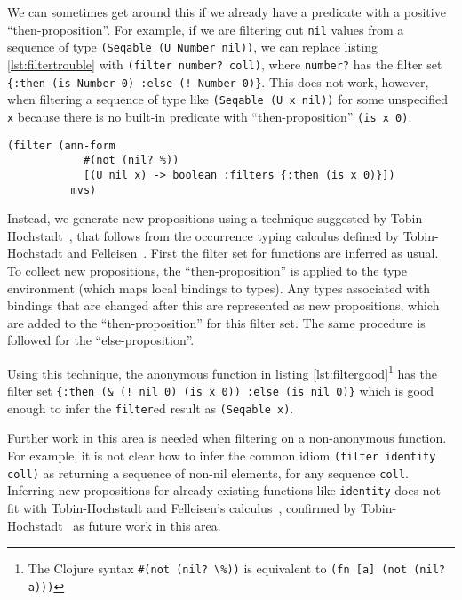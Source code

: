 We can sometimes get around this if we already have a predicate with a positive
``then-proposition''. For example, if we are filtering out \lstinline|nil| values
from a sequence of type \lstinline|(Seqable (U Number nil))|, we can replace
listing \ref{lst:filtertrouble} with \lstinline|(filter number? coll)|,
where \lstinline|number?| has the filter set \lstinline|{:then (is Number 0) :else (! Number 0)}|.
This does not work, however, when filtering a sequence of type like \lstinline|(Seqable (U x nil))|
for some unspecified \lstinline|x| because there is no built-in predicate with ``then-proposition''
\lstinline|(is x 0)|.

\begin{lstlisting}[caption=Filtering with negative propositions, label=lst:filtergood]
  (filter (ann-form 
            #(not (nil? %))
            [(U nil x) -> boolean :filters {:then (is x 0)}])
          mvs)
\end{lstlisting}

Instead, we generate new propositions using a technique 
suggested by Tobin-Hochstadt~\cite{Tob12},
that follows from the occurrence typing calculus defined 
by Tobin-Hochstadt and Felleisen~\cite{TF10}.
First the filter set for functions are inferred as usual.
To collect new propositions, the ``then-proposition'' is applied to the type environment (which maps
local bindings to types). Any types associated with bindings that are changed after this
are represented as new propositions, which are added to the ``then-proposition'' for this filter set.
The same procedure is followed for the ``else-proposition''.

Using this technique, the anonymous function in listing 
\ref{lst:filtergood}\footnote{The Clojure syntax \lstinline|#(not (nil? \%))| 
is equivalent to \lstinline|(fn [a] (not (nil? a)))|}
has the filter set \lstinline|{:then (& (! nil 0) (is x 0)) :else (is nil 0)}|
which is good enough to infer the \lstinline|filter|ed result as \lstinline|(Seqable x)|.

Further work in this area is needed when filtering on a non-anonymous function.
For example, it is not clear how to infer the common idiom \lstinline|(filter identity coll)|
as returning a sequence of non-nil elements, for any sequence \lstinline|coll|.
Inferring new propositions for already existing functions like \lstinline|identity|
does not fit with Tobin-Hochstadt and Felleisen's calculus~\cite{TF10},
confirmed by Tobin-Hochstadt~\cite{Tob12} as future work in this area.



